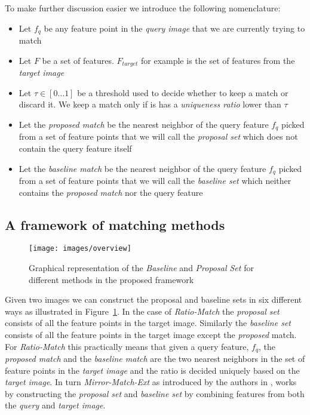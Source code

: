 \documentclass[journal]{IEEEtran}
\begin{document}
To make further discussion easier we introduce the following 
nomenclature:

\begin{itemize}
\item{Let $f_q$ be any feature point in the \emph{query image} that we 
    are currently trying to match}
\item{Let $F$ be a set of features. $F_{target}$ for example is the set 
    of features from the \emph{target image}}
\item{Let $\tau \in [0 \ldots 1]$ be a threshold used to decide whether 
    to keep a match or discard it. We keep a match only if is has a 
\emph{uniqueness ratio} lower than $\tau$}
\item{Let the \emph{proposed match} be the nearest neighbor of the query 
    feature $f_q$ picked from a set of feature points that we will call 
the \emph{proposal set} which does not contain the query feature itself}
\item{Let the \emph{baseline match} be the nearest neighbor of the query 
    feature $f_q$ picked from a set of feature points that we will call 
the \emph{baseline set} which neither contains the \emph{proposed match} 
nor the query feature}
\end{itemize}

%
\subsection{A framework of matching methods}
%

\begin{figure}[t]
\centering
\texttt{[image: images/overview]}
\caption{Graphical representation of the \emph{Baseline} and 
\emph{Proposal Set} for different methods in the proposed framework}
\label{fig:overview}
\end{figure}

Given two images we can construct the proposal and baseline sets in six 
different ways as illustrated in Figure~\ref{fig:overview}. In the case 
of \emph{Ratio-Match} \cite{lowe2004sift} the \emph{proposal set} 
consists of all the feature points in the target image.  Similarly the 
\emph{baseline set} consists of all the feature points in the target 
image except the \emph{proposed} match. For \emph{Ratio-Match} this 
practically means that given a query feature, $f_q$, the \emph{proposed 
match} and the \emph{baseline match} are the two nearest neighbors in 
the set of feature points in the \emph{target image} and the ratio is 
decided uniquely based on the \emph{target image}. In turn 
\emph{Mirror-Match-Ext} as introduced by the authors in 
\cite{arnfred2013mirror}, works by constructing the \emph{proposal set} 
and \emph{baseline set} by combining features from both the \emph{query} 
and \emph{target image}. 
\end{document}
